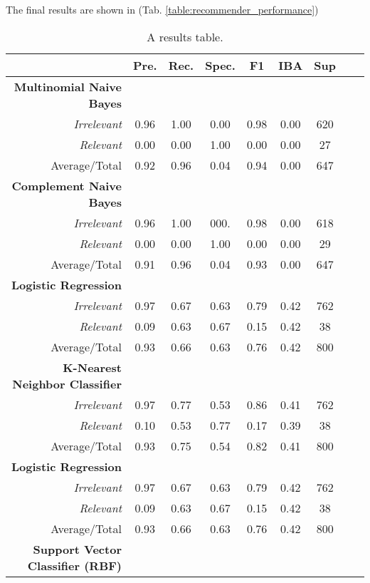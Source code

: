 The final results are shown in (Tab. \ref{table:recommender_performance})
\begin{table}

  \caption{A results table.}
  \centering
  \begin{tabular}{@{}rcccccccc@{}}
    \toprule
     & \textbf{Pre.} & \textbf{Rec.} & \textbf{Spec.}
    & \textbf{F1} &  \textbf{IBA}& \textbf{Sup} \\
    \midrule
    \textbf{Multinomial Naive Bayes}\\
    \emph{Irrelevant}& 0.96& 1.00&  0.00& 0.98& 0.00& 620 \\
    \emph{Relevant}& 0.00& 0.00&  1.00& 0.00& 0.00& 27 \\
    Average/Total& 0.92& 0.96& 0.04& 0.94& 0.00& 647 \vspace{2mm}\\
    \textbf{Complement Naive Bayes}\\
    \emph{Irrelevant}& 0.96& 1.00&  000.& 0.98& 0.00& 618 \\
    \emph{Relevant}& 0.00& 0.00&  1.00& 0.00& 0.00& 29 \\
    Average/Total& 0.91& 0.96& 0.04& 0.93& 0.00& 647 \vspace{2mm}\\
    \textbf{Logistic Regression}\\
    \emph{Irrelevant}& 0.97& 0.67&  0.63& 0.79& 0.42& 762 \\
    \emph{Relevant}& 0.09& 0.63&  0.67& 0.15& 0.42& 38 \\
    Average/Total& 0.93& 0.66& 0.63& 0.76& 0.42& 800 \vspace{2mm}\\
    \textbf{K-Nearest Neighbor Classifier}\\
    \emph{Irrelevant}& 0.97& 0.77&  0.53& 0.86& 0.41& 762 \\
    \emph{Relevant}& 0.10& 0.53&  0.77& 0.17& 0.39& 38 \\
    Average/Total& 0.93& 0.75& 0.54& 0.82& 0.41& 800 \vspace{2mm}\\
    \textbf{Logistic Regression}\\
    \emph{Irrelevant}& 0.97& 0.67&  0.63& 0.79& 0.42& 762 \\
    \emph{Relevant}& 0.09& 0.63&  0.67& 0.15& 0.42& 38 \\
    Average/Total& 0.93& 0.66& 0.63& 0.76& 0.42& 800 \vspace{2mm}\\
    \textbf{Support Vector Classifier (RBF)}\\

\end{tabular}
\end{table}
